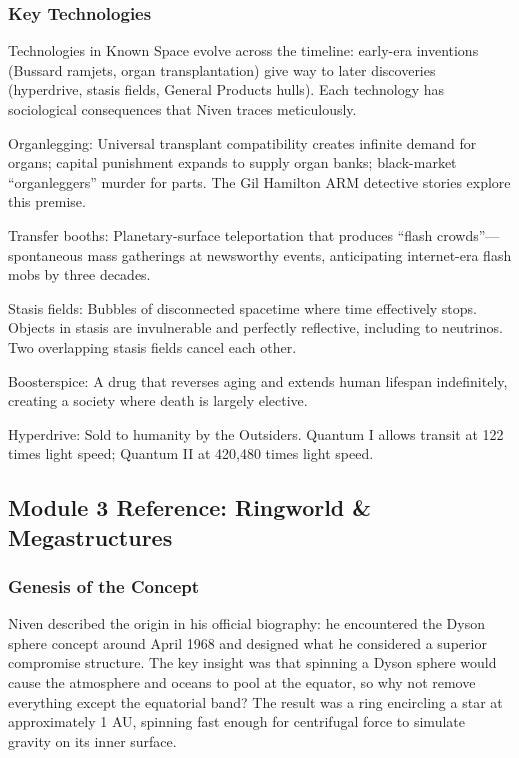 \documentclass[11pt,letterpaper]{article}
\begin{document}
\subsubsection{Key Technologies}

Technologies in Known Space evolve across the timeline: early-era inventions (Bussard ramjets, organ transplantation) give way to later discoveries (hyperdrive, stasis fields, General Products hulls). Each technology has sociological consequences that Niven traces meticulously.

Organlegging: Universal transplant compatibility creates infinite demand for organs; capital punishment expands to supply organ banks; black-market ``organleggers'' murder for parts. The Gil Hamilton ARM detective stories explore this premise.

Transfer booths: Planetary-surface teleportation that produces ``flash crowds''---spontaneous mass gatherings at newsworthy events, anticipating internet-era flash mobs by three decades.

Stasis fields: Bubbles of disconnected spacetime where time effectively stops. Objects in stasis are invulnerable and perfectly reflective, including to neutrinos. Two overlapping stasis fields cancel each other.

Boosterspice: A drug that reverses aging and extends human lifespan indefinitely, creating a society where death is largely elective.

Hyperdrive: Sold to humanity by the Outsiders. Quantum I allows transit at 122 times light speed; Quantum II at 420,480 times light speed.

\subsection{Module 3 Reference: Ringworld \& Megastructures}

\subsubsection{Genesis of the Concept}

Niven described the origin in his official biography: he encountered the Dyson sphere concept around April 1968 and designed what he considered a superior compromise structure. The key insight was that spinning a Dyson sphere would cause the atmosphere and oceans to pool at the equator, so why not remove everything except the equatorial band? The result was a ring encircling a star at approximately 1 AU, spinning fast enough for centrifugal force to simulate gravity on its inner surface.
\end{document}
